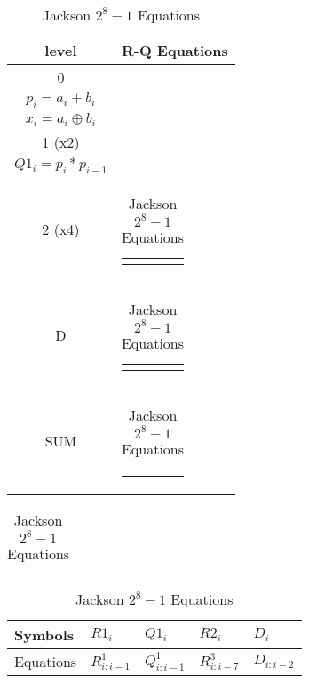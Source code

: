 \begin{table}[H]
\centering
     \begin{tabularx}{\textwidth}{ || c | X || } 

        \hline
        level & R-Q Equations\\
        \hline
        \hline
        
        0   & 
        \begin{tabular}{@{}c@{}}
        $g_i = a_i * b_i$\\
        $p_i = a_i + b_i$\\
        $x_i = a_i \oplus b_i $
        \end{tabular}\\\hline

        
        1 (x2)  & 
        \begin{tabular}{@{}c@{}}
        $R1_i = g_i + g_{i-1}$\\
        $Q1_i = p_i * p_{i-1}$
        \end{tabular}\\\hline

        2 (x4)  & 
        \begin{tabular}{@{}c@{}}
        $R2_i = R1_i + R1_{i-2} + Q1_{i-3}*R1_{i-4} + Q1_{i-3}*Q1_{i-5}*R1_{i-6}$
        \end{tabular}\\\hline

        D   & 
        \begin{tabular}{@{}c@{}}
        $ D_i = g_i + p_ig_{i-1} + p_ip_{i-1}p_{i-2}$
        \end{tabular}\\\hline

        SUM   & 
        \begin{tabular}{@{}c@{}}
        $ sum_i = R2_{i-1}\ ?\ (x_i \oplus D_{i-1})\ :\ x_i$
        \end{tabular}\\\hline

    \end{tabularx}
    
    
    \begin{tabularx}{\textwidth}{X} 
    \\
    \end{tabularx}    
    
    
    \begin{tabularx}{\textwidth}{| X | X X X X | } 
        \hline
        Symbols & $R1_i$ & $Q1_i$ & $R2_i$ & $D_i$ \\
        \hline
        Equations & $R^1_{i:i-1}$ & $Q^1_{i:i-1}$ & $R^3_{i:i-7}$ &$ D_{i:i-2}$ \\
        \hline
    \end{tabularx}
\caption{Jackson $2^{8}-1$ Equations}
\end{table}

